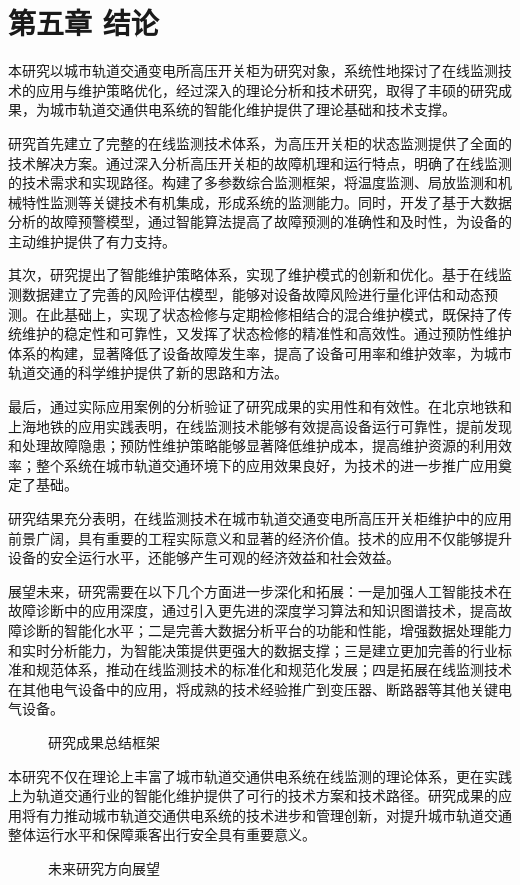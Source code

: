 \section{第五章 结论}

本研究以城市轨道交通变电所高压开关柜为研究对象，系统性地探讨了在线监测技术的应用与维护策略优化，经过深入的理论分析和技术研究，取得了丰硕的研究成果，为城市轨道交通供电系统的智能化维护提供了理论基础和技术支撑。

研究首先建立了完整的在线监测技术体系，为高压开关柜的状态监测提供了全面的技术解决方案。通过深入分析高压开关柜的故障机理和运行特点，明确了在线监测的技术需求和实现路径。构建了多参数综合监测框架，将温度监测、局放监测和机械特性监测等关键技术有机集成，形成系统的监测能力。同时，开发了基于大数据分析的故障预警模型，通过智能算法提高了故障预测的准确性和及时性，为设备的主动维护提供了有力支持。

其次，研究提出了智能维护策略体系，实现了维护模式的创新和优化。基于在线监测数据建立了完善的风险评估模型，能够对设备故障风险进行量化评估和动态预测。在此基础上，实现了状态检修与定期检修相结合的混合维护模式，既保持了传统维护的稳定性和可靠性，又发挥了状态检修的精准性和高效性。通过预防性维护体系的构建，显著降低了设备故障发生率，提高了设备可用率和维护效率，为城市轨道交通的科学维护提供了新的思路和方法。

最后，通过实际应用案例的分析验证了研究成果的实用性和有效性。在北京地铁和上海地铁的应用实践表明，在线监测技术能够有效提高设备运行可靠性，提前发现和处理故障隐患；预防性维护策略能够显著降低维护成本，提高维护资源的利用效率；整个系统在城市轨道交通环境下的应用效果良好，为技术的进一步推广应用奠定了基础。

研究结果充分表明，在线监测技术在城市轨道交通变电所高压开关柜维护中的应用前景广阔，具有重要的工程实际意义和显著的经济价值。技术的应用不仅能够提升设备的安全运行水平，还能够产生可观的经济效益和社会效益。

展望未来，研究需要在以下几个方面进一步深化和拓展：一是加强人工智能技术在故障诊断中的应用深度，通过引入更先进的深度学习算法和知识图谱技术，提高故障诊断的智能化水平；二是完善大数据分析平台的功能和性能，增强数据处理能力和实时分析能力，为智能决策提供更强大的数据支撑；三是建立更加完善的行业标准和规范体系，推动在线监测技术的标准化和规范化发展；四是拓展在线监测技术在其他电气设备中的应用，将成熟的技术经验推广到变压器、断路器等其他关键电气设备。

\begin{figure}[h]
\centering
\caption{研究成果总结框架}
\label{fig:research_achievements_summary}
\end{figure}

本研究不仅在理论上丰富了城市轨道交通供电系统在线监测的理论体系，更在实践上为轨道交通行业的智能化维护提供了可行的技术方案和技术路径。研究成果的应用将有力推动城市轨道交通供电系统的技术进步和管理创新，对提升城市轨道交通整体运行水平和保障乘客出行安全具有重要意义。

\begin{figure}[h]
\centering
\caption{未来研究方向展望}
\label{fig:future_research_directions}
\end{figure}